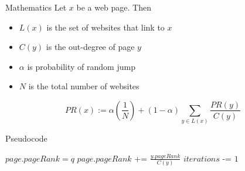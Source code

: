 \begin{frame}{Mathematics}
    Let $x$ be a web page. Then
    \begin{itemize}
        \item $L(x)$ is the set of websites that link to $x$
        \item $C(y)$ is the out-degree of page $y$
        \item $\alpha$ is probability of random jump
        \item $N$ is the total number of websites
    \end{itemize}

    \[\displaystyle PR(x) := \alpha \left ( \frac{1}{N} \right ) + (1-\alpha) \sum_{y\in L(x)} \frac{PR(y)}{C(y)}\]
\end{frame}

\begin{frame}{Pseudocode}
        \begin{algorithmic}

                 
                      
                         \State $page.pageRank = q$
                         
                             \State $page.pageRank$ += $\frac{y.pageRank}{C(y)}$
                         \EndFor
{}                     \EndFor
{}                     \State $iterations$ -= $1$
                 \EndWhile
{}             \EndFunction
        \end{algorithmic}
\end{frame}
